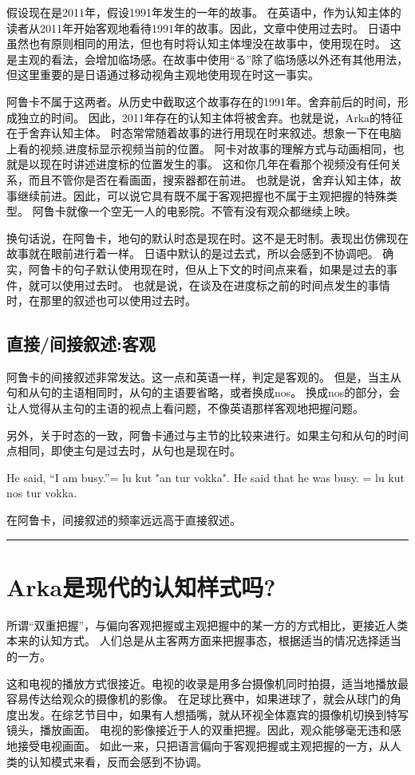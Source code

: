假设现在是2011年，假设1991年发生的一年的故事。
在英语中，作为认知主体的读者从2011年开始客观地看待1991年的故事。因此，文章中使用过去时。
日语中虽然也有原则相同的用法，但也有时将认知主体埋没在故事中，使用现在时。
这是主观的看法，会增加临场感。在故事中使用“る”除了临场感以外还有其他用法，但这里重要的是日语通过移动视角主观地使用现在时这一事实。

阿鲁卡不属于这两者。从历史中截取这个故事存在的1991年。舍弃前后的时间，形成独立的时间。
因此，2011年存在的认知主体将被舍弃。也就是说，Arka的特征在于舍弃认知主体。
时态常常随着故事的进行用现在时来叙述。想象一下在电脑上看的视频,进度标显示视频当前的位置。
阿卡对故事的理解方式与动画相同，也就是以现在时讲述进度标的位置发生的事。
这和你几年在看那个视频没有任何关系，而且不管你是否在看画面，搜索器都在前进。
也就是说，舍弃认知主体，故事继续前进。因此，可以说它具有既不属于客观把握也不属于主观把握的特殊类型。
阿鲁卡就像一个空无一人的电影院。不管有没有观众都继续上映。

换句话说，在阿鲁卡，地句的默认时态是现在时。这不是无时制。表现出仿佛现在故事就在眼前进行着一样。
日语中默认的是过去式，所以会感到不协调吧。
确实，阿鲁卡的句子默认使用现在时，但从上下文的时间点来看，如果是过去的事件，就可以使用过去时。
也就是说，在谈及在进度标之前的时间点发生的事情时，在那里的叙述也可以使用过去时。

\subsection{直接/间接叙述:客观}
阿鲁卡的间接叙述非常发达。这一点和英语一样，判定是客观的。
但是，当主从句和从句的主语相同时，从句的主语要省略，或者换成nos。
换成nos的部分，会让人觉得从主句的主语的视点上看问题，不像英语那样客观地把握问题。

另外，关于时态的一致，阿鲁卡通过与主节的比较来进行。如果主句和从句的时间点相同，即使主句是过去时，从句也是现在时。

He said, “I am busy.”= lu kut "an tur vokka".
He said that he was busy. = lu kut nos tur vokka.

在阿鲁卡，间接叙述的频率远远高于直接叙述。
{\noindent} \rule[-10pt]{17.5cm}{0.05em}

\section{Arka是现代的认知样式吗?}
所谓“双重把握”，与偏向客观把握或主观把握中的某一方的方式相比，更接近人类本来的认知方式。
人们总是从主客两方面来把握事态，根据适当的情况选择适当的一方。

这和电视的播放方式很接近。电视的收录是用多台摄像机同时拍摄，适当地播放最容易传达给观众的摄像机的影像。
在足球比赛中，如果进球了，就会从球门的角度出发。在综艺节目中，如果有人想插嘴，就从环视全体嘉宾的摄像机切换到特写镜头，播放画面。
电视的影像接近于人的双重把握。因此，观众能够毫无违和感地接受电视画面。
如此一来，只把语言偏向于客观把握或主观把握的一方，从人类的认知模式来看，反而会感到不协调。

